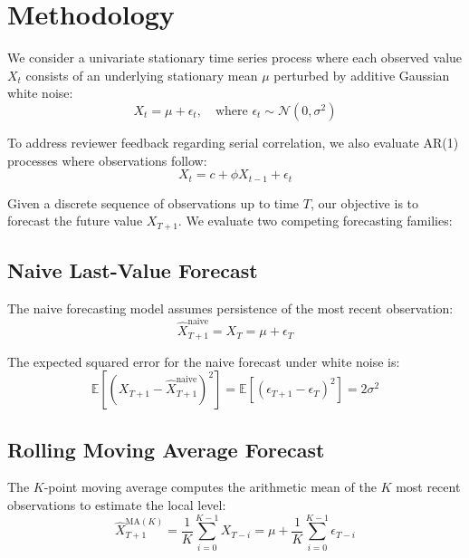 \documentclass[11pt,letterpaper]{article}
\begin{document}
\section{Methodology}

We consider a univariate stationary time series process where each observed value $X_t$ consists of an underlying stationary mean $\mu$ perturbed by additive Gaussian white noise:
\begin{equation}
X_t = \mu + \epsilon_t, \quad \text{where } \epsilon_t \sim \mathcal{N}(0, \sigma^2)
\end{equation}

To address reviewer feedback regarding serial correlation, we also evaluate AR(1) processes where observations follow:
\begin{equation}
X_t = c + \phi X_{t-1} + \epsilon_t
\end{equation}

Given a discrete sequence of observations up to time $T$, our objective is to forecast the future value $X_{T+1}$. We evaluate two competing forecasting families:

\subsection{Naive Last-Value Forecast}
The naive forecasting model assumes persistence of the most recent observation:
\begin{equation}
\hat{X}_{T+1}^{\text{naive}} = X_T = \mu + \epsilon_T
\end{equation}

The expected squared error for the naive forecast under white noise is:
\begin{equation}
\mathbb{E}\left[ (X_{T+1} - \hat{X}_{T+1}^{\text{naive}})^2 \right] = \mathbb{E}\left[ (\epsilon_{T+1} - \epsilon_T)^2 \right] = 2 \sigma^2
\end{equation}

\subsection{Rolling Moving Average Forecast}
The $K$-point moving average computes the arithmetic mean of the $K$ most recent observations to estimate the local level:
\begin{equation}
\hat{X}_{T+1}^{\text{MA}(K)} = \frac{1}{K} \sum_{i=0}^{K-1} X_{T-i} = \mu + \frac{1}{K} \sum_{i=0}^{K-1} \epsilon_{T-i}
\end{equation}
\end{document}

